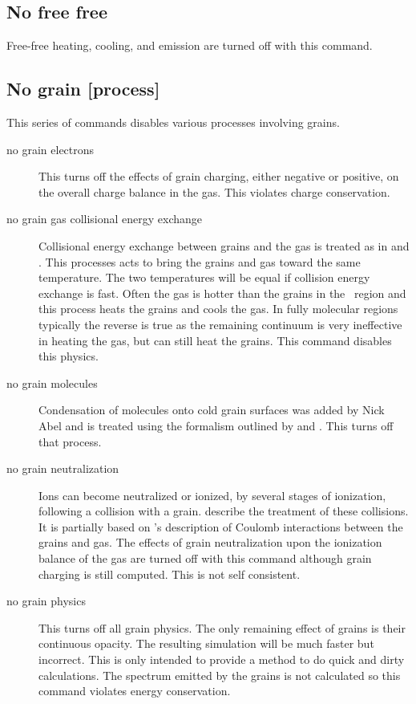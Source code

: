 \subsection{No free free}

Free-free heating, cooling, and emission are turned off with this command.

\subsection{No grain [process]}

This series of commands disables various processes involving grains.
\begin{description}
\item[no grain electrons]   This turns off the effects of grain charging, either
negative or positive, on the overall charge balance in the gas.  This
violates charge conservation.

\item[no grain gas collisional energy exchange]   Collisional energy exchange
between grains and the gas is treated as in \citet{VanHoof2004} and \citet{Abel2005}.   This processes acts to bring the grains and gas toward
the same temperature.  The two temperatures will be equal if collision energy
exchange is fast.  Often the gas is hotter than the grains in the \hplus\ region
and this process heats the grains and cools the gas.  In fully molecular
regions typically the reverse is true as the remaining continuum is very
ineffective in heating the gas, but can still heat the grains. This command
disables this physics.

\item[no grain molecules]  Condensation of molecules onto cold grain surfaces
was added by Nick Abel and is treated using the formalism outlined by
\citet{Hasegawa1992} and \citet{Hasegawa1993}.  This turns off that
process.

\item[no grain neutralization]  Ions can become neutralized or ionized, by
several stages of ionization, following a collision with a grain.
 describe the treatment of these collisions.
It is partially based on \citet{Draine1987}'s description of
Coulomb interactions between the grains and gas.
The effects of grain neutralization upon the ionization
balance of the gas are turned off with this command although grain charging
is still computed.  This is not self consistent.

\item[no grain physics]  This turns off all grain physics.  The only remaining
effect of grains is their continuous opacity.  The resulting simulation
will be much faster but incorrect.  This is only intended to provide a method
to do quick and dirty calculations. The spectrum emitted by the grains is
not calculated so this command violates energy conservation.


\end{description}
